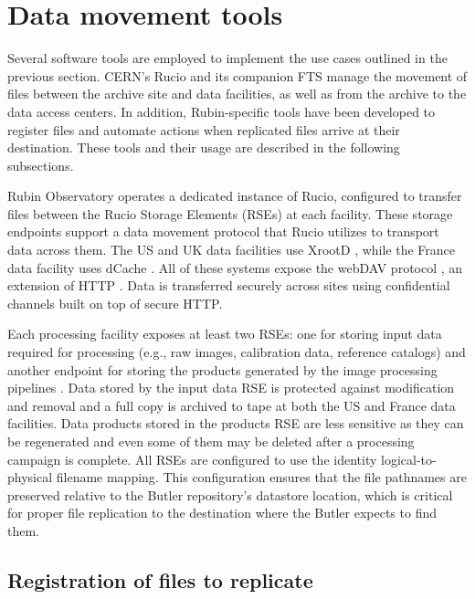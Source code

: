 \documentclass{webofc}
\begin{document}
\section{Data movement tools}
\label{section-data-movement-tools}

Several software tools are employed to implement the use cases outlined in the previous section. CERN's Rucio \cite{rucio2019} and its companion FTS \cite{FTS} manage the movement of files between the archive site and data facilities, as well as from the archive to the data access centers. In addition, Rubin-specific tools have been developed to register files and automate actions when replicated files arrive at their destination. These tools and their usage are described in the following subsections.

Rubin Observatory operates a dedicated instance of Rucio, configured to transfer files between the Rucio Storage Elements (RSEs) at each facility. These storage endpoints support a data movement protocol that Rucio utilizes to transport data across them. The US and UK data facilities use XrootD \cite{xrootd}, while the France data facility uses dCache \cite{dCache}. All of these systems expose the webDAV protocol \cite{webdav}, an extension of HTTP \cite{http1.1}. Data is transferred securely across sites using confidential channels built on top of secure HTTP.

Each processing facility exposes at least two RSEs: one for storing input data required for processing (e.g., raw images, calibration data, reference catalogs) and another endpoint for storing the products generated by the image processing pipelines \cite{DMTN-213}. Data stored by the input data RSE is protected against modification and removal and a full copy is archived to tape at both the US and France data facilities. Data products stored in the products RSE are less sensitive as they can be regenerated and even some of them may be deleted after a processing campaign is complete. All RSEs are configured to use the identity logical-to-physical filename mapping. This configuration ensures that the file pathnames are preserved relative to the Butler repository's datastore location, which is critical for proper file replication to the destination where the Butler expects to find them.

\subsection{Registration of files to replicate}
\label{registration}
\end{document}
